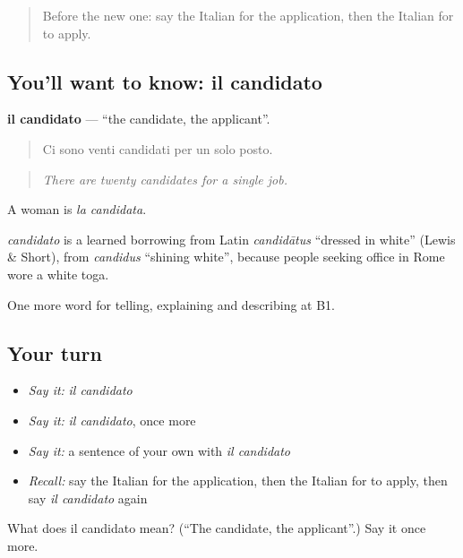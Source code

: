 \begin{quote}
Before the new one: say the Italian for the application, then the Italian for to apply.
\end{quote}

\subsection*{You'll want to know: il candidato}
\textbf{il candidato} — \textquotedblleft{}the candidate, the applicant\textquotedblright{}.

\begin{quote}
Ci sono venti candidati per un solo posto.
\end{quote}

\begin{quote}
\emph{There are twenty candidates for a single job.}
\end{quote}

A woman is \emph{la candidata}.

\begin{cousinweb}
\emph{candidato} is a learned borrowing from Latin \emph{candidātus} \textquotedblleft{}dressed in white\textquotedblright{} (Lewis \& Short), from \emph{candidus} \textquotedblleft{}shining white\textquotedblright{}, because people seeking office in Rome wore a white toga.
\end{cousinweb}

\begin{grammarlens}[title={What you've built}]
One more word for telling, explaining and describing at B1.
\end{grammarlens}

\subsection*{Your turn}
\begin{itemize}
\raggedright
  \item \emph{Say it:} \emph{il candidato}
  \item \emph{Say it:} \emph{il candidato}, once more
  \item \emph{Say it:} a sentence of your own with \emph{il candidato}
  \item \emph{Recall:} say the Italian for the application, then the Italian for to apply, then say \emph{il candidato} again
\end{itemize}

\begin{tcolorbox}[breakable,colback=teal!4,colframe=teal!35!black,title={Before you move on}]
What does il candidato mean? (\textquotedblleft{}The candidate, the applicant\textquotedblright{}.) Say it once more.
\end{tcolorbox}
